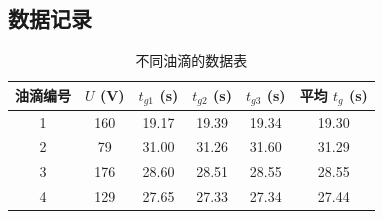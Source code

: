 \documentclass[12pt,a4paper,UTF8]{ctexart}
\begin{document}
\subsection*{数据记录}
\begin{table}[htbp]
  \centering
  \begin{tabular}{cccccc}
    \toprule
    油滴编号 & $U$ (V) & $t_{g1}$ (s) & $t_{g2}$ (s) & $t_{g3}$ (s) & 平均 $t_{g}$ (s) \\
    \midrule
    1 &160 &19.17 &19.39 &19.34 &19.30 \\
    2 &79 &31.00 &31.26 &31.60 &31.29 \\
    3 &176 &28.60 &28.51 &28.55 &28.55 \\
    4 &129 &27.65 &27.33 &27.34 &27.44 \\
    \bottomrule
  \end{tabular}
  \caption{不同油滴的数据表}
  \label{tab:data}
\end{table}
\end{document}

